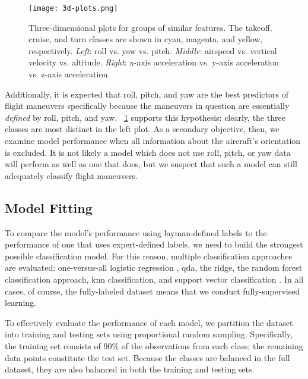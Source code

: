 \documentclass[../main.tex]{subfiles}
\begin{document}
\begin{figure}
    \centerline{\texttt{[image: 3d-plots.png]}}
    \caption{Three-dimensional plots for groups of similar features. The takeoff, cruise, and turn classes are shown in cyan, magenta, and yellow, respectively. \textit{Left}: roll vs. yaw vs. pitch. \textit{Middle}: airspeed vs. vertical velocity vs. altitude. \textit{Right}: x-axis acceleration vs. y-axis acceleration vs. z-axis acceleration.}
    \label{fig:3d-plots}
\end{figure}


Additionally, it is expected that roll, pitch, and yaw are the best predictors of flight maneuvers specifically because the maneuvers in question are essentially \textit{defined} by roll, pitch, and yaw. \figurename \ \ref{fig:3d-plots} supports this hypothesis: clearly, the three classes are most distinct in the left plot. As a secondary objective, then, we examine model performance when all information about the aircraft's orientation is excluded. It is not likely a model which does not use roll, pitch, or yaw data will perform as well as one that does, but we suspect that such a model can still adequately classify flight maneuvers.

\subsection{Model Fitting}


To compare the model's performance using layman-defined labels to the performance of one that uses expert-defined labels, we need to build the strongest possible classification model. For this reason, multiple classification approaches are evaluated: one-versus-all logistic regression \cite{Bishop2006}, \ac{qda}, the ridge, the random forest classification approach, \ac{knn} classification, and support vector classification \cite{James2013}. In all cases, of course, the fully-labeled dataset means that we conduct fully-supervised learning.


To effectively evaluate the performance of each model, we partition the dataset into training and testing sets using proportional random sampling. Specifically, the training set consists of $90\%$ of the observations from each class; the remaining data points constitute the test set. Because the classes are balanced in the full dataset, they are also balanced in both the training and testing sets.
\end{document}
